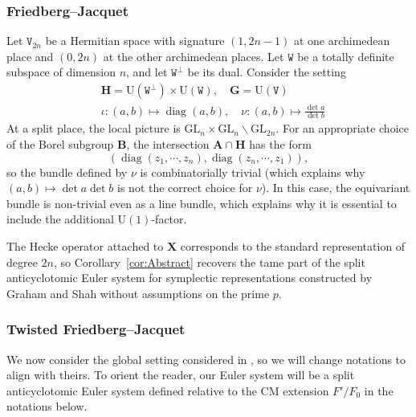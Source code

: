 \documentclass{amsart}
\theoremstyle{definition}
\theoremstyle{remark}
\newcommand{\1}{\mathbf{1}}
\newcommand{\GL}{\mathrm{GL}}
\newcommand{\mb}[1]{\mathbf{#1}}
\newcommand{\U}{\mathrm{U}}
\DeclareMathOperator{\diag}{diag}
\theoremstyle{definition}
\newcommand{\bG}{\mathbf{G}}
\begin{document}
\subsubsection{Friedberg--Jacquet \cite{GrahamShah}}
Let $\mathtt{V}_{2n}$ be a Hermitian space with signature $(1,2n-1)$ at one archimedean place and $(0,2n)$ at the other archimedean places. Let $\mathtt{W}$ be a totally definite subspace of dimension $n$, and let $\mathtt{W}^\perp$ be its dual. Consider the setting
\begin{align*}
  &\mb{H}=\U(\mathtt{W}^\perp)\times\U(\mathtt{W}),\quad\bG=\U(\mathtt{V})\\
  &\iota:(a,b)\mapsto \diag(a,b),\quad \nu:(a,b)\mapsto\frac{\det a}{\det b}
\end{align*}
At a split place, the local picture is $\GL_n\times\GL_n\backslash\GL_{2n}$. For an appropriate choice of the Borel subgroup $\mb{B}$, the intersection $\mb{A}\cap\mb{H}$ has the form
\[
  (\diag(z_1,\cdots,z_n),\diag(z_n,\cdots,z_1)),
\]
so the bundle defined by $\nu$ is combinatorially trivial (which explains why $(a,b)\mapsto\det a\det b$ is not the correct choice for $\nu$). In this case, the equivariant bundle is non-trivial even as a line bundle, which explains why it is essential to include the additional $\U(1)$-factor.

The Hecke operator attached to $\mb{X}$ corresponds to the standard representation of degree $2n$, so Corollary~\ref{cor:Abstract} recovers the tame part of the split anticyclotomic Euler system for symplectic representations constructed by Graham and Shah \cite[Proposition 9.27]{GrahamShah} without assumptions on the prime $p$.

\subsubsection{Twisted Friedberg--Jacquet}
We now consider the global setting considered in \cite{LXZ-TwistedFL}, so we will change notations to align with theirs. To orient the reader, our Euler system will be a split anticyclotomic Euler system defined relative to the CM extension $F'/F_0$ in the notations below.
\end{document}
